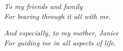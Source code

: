 \documentclass[\main/thesis.tex]{subfiles}
\begin{document}
\begin{dedication}
	\vspace*{1in}
	\begin{center}
    \emph{To my friends and family} \\
    \emph{For bearing through it all with me.}
	\end{center}
	\vspace*{1in}
	\begin{center}
    \emph{And especially, to my mother, Janice} \\
    \emph{For guiding me in all aspects of life.}
	\end{center}
\end{dedication}
\end{document}
